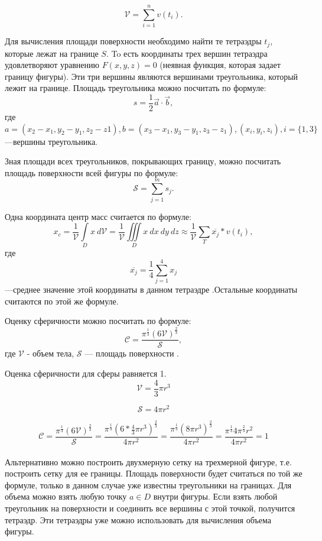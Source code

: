 $$ \mathscr{V} = \sum\limits_{i=1}^{n} v(t_{i}).$$

Для вычисления площади поверхности необходимо найти те тетраэдры $t_{j}$, которые лежат на границе $S$. To есть координаты трех вершин тетраэдра удовлетворяют уравнению $F(x,y,z) = 0$ (неявная функция, которая задает границу фигуры). Эти три вершины являются вершинами треугольника, который лежит на границе. Площадь треугольника можно посчитать по формуле:
$$ s = \frac{1}{2}\Vec{a}\cdot\Vec{b},$$
где $ a = (x_{2}-x_{1},y_{2}-y_{1},z_{2}-z{1}), b = (x_{3}-x_{1},y_{3}-y_{1},z_{3}-z_{1}), (x_{i},y_{i},z_{i}), i = \{1,3\}$ ---вершины треугольника.

Зная площади всех треугольников, покрывающих границу, можно посчитать площадь поверхности всей фигуры по формуле:
$$\mathscr{S} = \sum\limits_{j = 1}^{m} s_{j}.$$

Одна координата центр масс считается по формуле:
$$
	x_{c} =\frac{1}{\mathscr{V}} \int\limits_{D}x~d\mathscr{V} = \frac{1}{\mathscr{V}} \iiint\limits_{D}x~dx~dy~dz \approx \frac{1}{\mathscr{V}}\sum \limits_{T} \overline{x_{j}}*v(t_{i}),
$$
где 
$$ \overline{x_{j}} = \frac{1}{4}\sum\limits_{j = 1}^{4}x_{j}$$
---среднее значение этой координаты в данном тетраэдре \cite[c.~34]{ns}.Остальные координаты считаются по этой же формуле. 

Оценку сферичности можно посчитать по формуле:
$$\mathscr{C} = \frac{\pi^{\frac{1}{3}}( 6 \mathscr{V})^{\frac{2}{3}}}{\mathscr{S}},$$
где $\mathscr{V}$ - объем тела, $\mathscr{S}$ --- площадь поверхности \cite[c.~34]{ns}.

Оценка сферичности для сферы равняется 1.
$$\mathscr{V} = \frac{4}{3}\pi r^{3}$$

$$\mathscr{S} = 4\pi r^{2}$$

$$\mathscr{C} = \frac{\pi^{\frac{1}{3}}(6 \mathscr{V})^{\frac{2}{3}}}{\mathscr{S}}
= \frac{\pi^{\frac{1}{3}}( 6* \frac{4}{3}\pi r^{3})^{\frac{2}{3}}}{4\pi r^{2}}
= \frac{\pi^{\frac{1}{3}}( 8\pi r^{3})^{\frac{2}{3}}}{4\pi r^{2}}
= \frac{\pi^{\frac{1}{3}} 4\pi^{\frac{2}{3}}r^{2}}{4\pi r^{2}} = 1$$
\\

Альтернативно можно построить двухмерную сетку на трехмерной фигуре, т.е. построить сетку для ее границы. Площадь поверхности будет считаться по той же формуле, только в данном случае уже известны треугольники на границах. Для объема можно взять любую точку $a \in D $ внутри фигуры. Если взять любой треугольник на поверхности и соединить все вершины с этой точкой, получится тетраэдр. Эти тетраэдры уже можно использовать для вычисления объема фигуры. 

